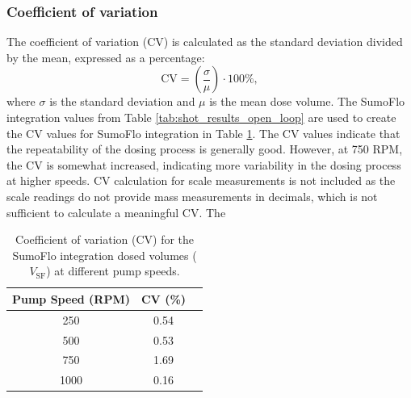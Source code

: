 \documentclass[12pt,a4paper]{article}
\begin{document}
\subsubsection{Coefficient of variation}
The coefficient of variation (CV) is calculated as the standard deviation divided by the mean, expressed as a percentage:
\begin{equation}
    \text{CV} = \left( \frac{\sigma}{\mu} \right) \cdot 100\%,
\end{equation}
where $\sigma$ is the standard deviation and $\mu$ is the mean dose volume. The SumoFlo integration values from Table \ref{tab:shot_results_open_loop} are used to create the CV values for SumoFlo integration in Table \ref{tab:cv_open_loop}. The CV values indicate that the repeatability of the dosing process is generally good. However, at 750 RPM, the CV is somewhat increased, indicating more variability in the dosing process at higher speeds. CV calculation for scale measurements is not included as the scale readings do not provide mass measurements in decimals, which is not sufficient to calculate a meaningful CV. The 

\begin{table}[h!]
\centering
\begin{tabular}{c cc}
\toprule
\textbf{Pump Speed (RPM)} & \textbf{CV (\%)} \\
\midrule
250 & 0.54 \\
500 & 0.53 \\
750 & 1.69 \\
1000 & 0.16 \\
\bottomrule
\end{tabular}
\caption{Coefficient of variation (CV) for the SumoFlo integration dosed volumes ($V_{\text{SF}}$) at different pump speeds.}
\label{tab:cv_open_loop}
\end{table}

\newpage
\end{document}
